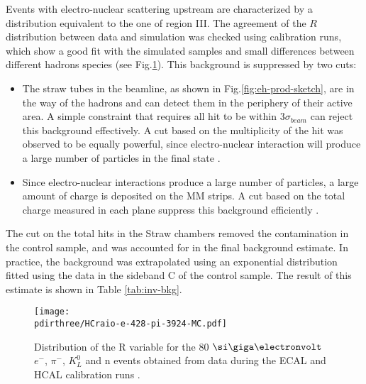 Events with electro-nuclear scattering upstream are characterized by a distribution equivalent to the one of region III. The agreement of the $R$ distribution between data and simulation was checked using calibration runs, which show a good fit with the simulated samples and small differences between different hadrons species (see Fig.\ref{fig:R-comp}). This background is suppressed by two cuts:

\begin{itemize}
\item The straw tubes in the beamline, as shown in Fig.\ref{fig:eh-prod-sketch}, are in the way of the hadrons and can detect them in the periphery of their active area. A simple constraint that requires all hit to be within 3$\sigma_{beam}$ can reject this background effectively. A cut based on the multiplicity of the hit was observed to be equally powerful, since electro-nuclear interaction will produce a large number of particles in the final state \cite{pdegen-thesis}.
\item Since electro-nuclear interactions produce a large number of particles, a large amount of charge is deposited on the MM strips. A cut based on the total charge measured in each plane suppress this background efficiently \cite{na64-invisible-cuts}.
\end{itemize}

The cut on the total hits in the Straw chambers removed the contamination in the control sample, and was accounted for in the final background estimate. In practice, the background was extrapolated using an exponential distribution fitted using the data in the sideband C of the control sample. The result of this estimate is shown in Table \ref{tab:inv-bkg}.

\begin{figure}[bht!]
  \centering
  \texttt{[image: \\pdirthree/HCraio-e-428-pi-3924-MC.pdf]}
  \caption[R value comparison]{Distribution of the R variable for the 80 $\gev$ $e^-$, $\pi^-$, $K_L^0$ and n events obtained from data during the ECAL and HCAL calibration runs \cite{Banerjee:2020fue}.}
  \label{fig:R-comp}
\end{figure}

